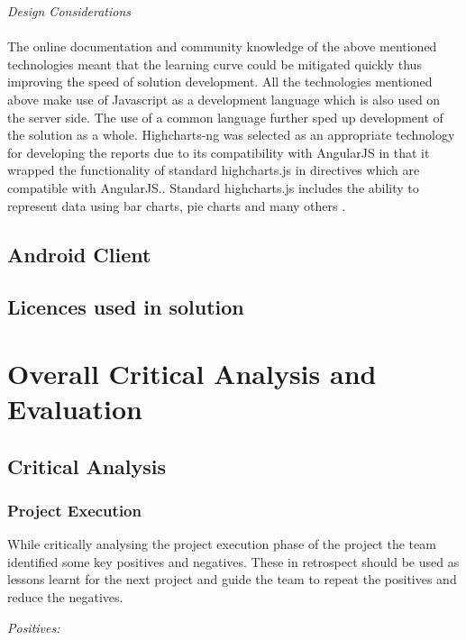 \documentclass[12pt]{witseiepaper}
\begin{document}
\textit{Design Considerations} \\\\
The online documentation and community knowledge of the above mentioned technologies meant that the learning curve could be mitigated quickly thus improving the speed of solution development. All the technologies mentioned above make use of Javascript as a development language which is also used on the server side. The use of a common language further sped up development of the solution as a whole. Highcharts-ng was selected as an appropriate technology for developing the reports due to its compatibility with AngularJS in that it wrapped the functionality of standard highcharts.js in directives which are compatible with AngularJS.. Standard highcharts.js includes the ability to represent data using bar charts, pie charts and many others \cite{Highcharts}.

\subsection{Android Client}

\subsection{Licences used in solution}

\section{Overall Critical Analysis and Evaluation}

\subsection{Critical Analysis}


\subsubsection{Project Execution}



While critically analysing the project execution phase of the project the team identified some key positives and negatives. These in retrospect should be used as lessons learnt for the next project and guide the team to repeat the positives and reduce the negatives.

\textit{Positives:}
\end{document}
